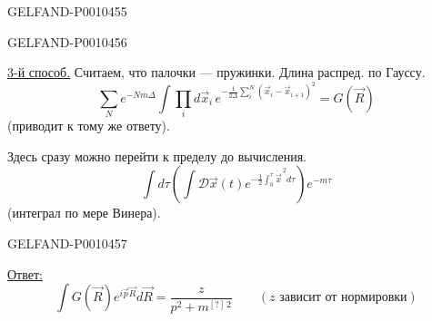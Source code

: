 \begin{GelfandAdjacentEvidence}{GELFAND-P001045}{5}

\end{GelfandAdjacentEvidence}
\begin{GelfandAdjacentEvidence}{GELFAND-P001045}{6}


\underline{3-й способ.} Считаем, что палочки — пружинки. Длина распред. по Гауссу.
\begin{equation*}
\sum_N e^{-Nm\Delta}\int\prod_i d\vec{x}_i\,
e^{-\frac{1}{2\Delta}\sum_i^N(\vec{x}_i-\vec{x}_{i+1})^2}=G(\vec{R})
\tag{22}
\end{equation*}
(приводит к тому же ответу).

Здесь сразу можно перейти к пределу до вычисления.
\begin{equation*}
\int d\tau\left(\int\mathcal{D}\vec{x}(t)
e^{-\frac12\int_0^\tau\dot{\vec{x}}^{\,2}d\tau}\right)e^{-m\tau}
\tag{23}
\end{equation*}
(интеграл по мере Винера).
\end{GelfandAdjacentEvidence}
\begin{GelfandAdjacentEvidence}{GELFAND-P001045}{7}


\underline{Ответ:}
\begin{equation*}
\int G(\vec{R})e^{i\vec{p}\vec{R}}d\vec{R}=\frac{z}{p^2+m^{[?]\,2}}
\qquad(z\text{ зависит от нормировки})
\tag{24}
\end{equation*}
\end{GelfandAdjacentEvidence}
